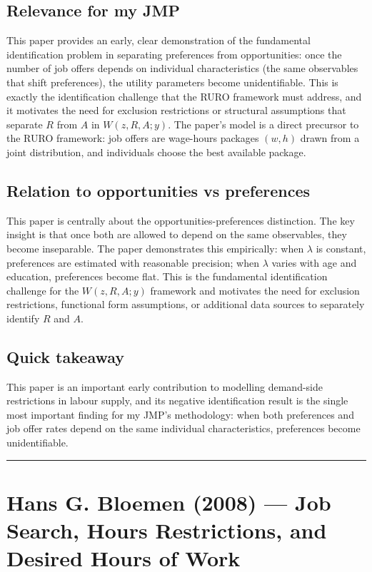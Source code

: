 \documentclass[11pt,a4paper]{article}
\begin{document}
\subsection*{Relevance for my JMP}
This paper provides an early, clear demonstration of the fundamental identification problem in separating preferences from opportunities: once the number of job offers depends on individual characteristics (the same observables that shift preferences), the utility parameters become unidentifiable. This is exactly the identification challenge that the RURO framework must address, and it motivates the need for exclusion restrictions or structural assumptions that separate $R$ from $A$ in $W(z, R, A; y)$. The paper's model is a direct precursor to the RURO framework: job offers are wage-hours packages $(w, h)$ drawn from a joint distribution, and individuals choose the best available package.

\subsection*{Relation to opportunities vs preferences}
This paper is centrally about the opportunities-preferences distinction. The key insight is that once both are allowed to depend on the same observables, they become inseparable. The paper demonstrates this empirically: when $\lambda$ is constant, preferences are estimated with reasonable precision; when $\lambda$ varies with age and education, preferences become flat. This is the fundamental identification challenge for the $W(z, R, A; y)$ framework and motivates the need for exclusion restrictions, functional form assumptions, or additional data sources to separately identify $R$ and $A$.

\subsection*{Quick takeaway}
This paper is an important early contribution to modelling demand-side restrictions in labour supply, and its negative identification result is the single most important finding for my JMP's methodology: when both preferences and job offer rates depend on the same individual characteristics, preferences become unidentifiable.


\medskip\hrule\medskip

\section*{Hans G. Bloemen (2008) — Job Search, Hours Restrictions, and Desired Hours of Work}
\end{document}
